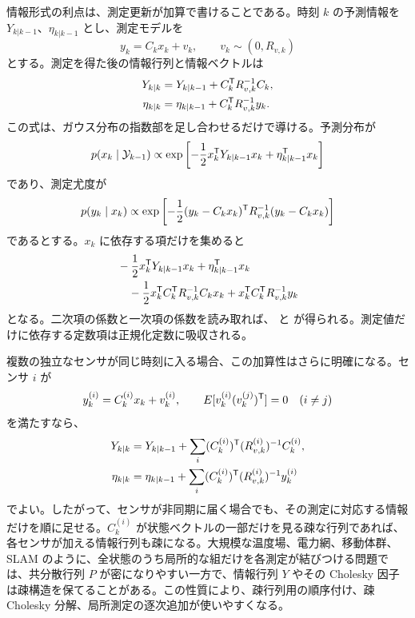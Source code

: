 情報形式の利点は、測定更新が加算で書けることである。時刻 $k$ の予測情報を $Y_{k|k-1}$、$\eta_{k|k-1}$ とし、測定モデルを
\begin{equation}
  y_k=C_kx_k+v_k,
  \qquad
  v_k\sim(0,R_{v,k})
\end{equation}
とする。測定を得た後の情報行列と情報ベクトルは
\begin{align}
  Y_{k|k}
  &=
  Y_{k|k-1}+C_k^{\mathsf{T}} R_{v,k}^{-1}C_k,
  \label{eq:information-update-matrix}\\
  \eta_{k|k}
  &=
  \eta_{k|k-1}+C_k^{\mathsf{T}} R_{v,k}^{-1}y_k.
  \label{eq:information-update-vector}
\end{align}
この式は、ガウス分布の指数部を足し合わせるだけで導ける。予測分布が
\begin{equation}
  p(x_k\mid\mathcal{Y}_{k-1})
  \propto
  \exp\left[
    -\frac{1}{2}x_k^{\mathsf{T}} Y_{k|k-1}x_k
    +\eta_{k|k-1}^{\mathsf{T}} x_k
  \right]
\end{equation}
であり、測定尤度が
\begin{equation}
  p(y_k\mid x_k)
  \propto
  \exp\left[
    -\frac{1}{2}(y_k-C_kx_k)^{\mathsf{T}} R_{v,k}^{-1}(y_k-C_kx_k)
  \right]
\end{equation}
であるとする。$x_k$ に依存する項だけを集めると
\begin{align}
  &-\frac{1}{2}x_k^{\mathsf{T}} Y_{k|k-1}x_k+\eta_{k|k-1}^{\mathsf{T}} x_k\\
  &\quad
  -\frac{1}{2}x_k^{\mathsf{T}} C_k^{\mathsf{T}} R_{v,k}^{-1}C_kx_k
  +x_k^{\mathsf{T}} C_k^{\mathsf{T}} R_{v,k}^{-1}y_k
\end{align}
となる。二次項の係数と一次項の係数を読み取れば、 と  が得られる。測定値だけに依存する定数項は正規化定数に吸収される。

複数の独立なセンサが同じ時刻に入る場合、この加算性はさらに明確になる。センサ $i$ が
\begin{equation}
  y_k^{(i)}=C_k^{(i)}x_k+v_k^{(i)},
  \qquad
  E[v_k^{(i)}(v_k^{(j)})^{\mathsf{T}}]=0\quad(i\ne j)
\end{equation}
を満たすなら、
\begin{align}
  Y_{k|k}
  &=
  Y_{k|k-1}
  +\sum_i (C_k^{(i)})^{\mathsf{T}}
    (R_{v,k}^{(i)})^{-1}C_k^{(i)},\\
  \eta_{k|k}
  &=
  \eta_{k|k-1}
  +\sum_i (C_k^{(i)})^{\mathsf{T}}
    (R_{v,k}^{(i)})^{-1}y_k^{(i)}
\end{align}
でよい。したがって、センサが非同期に届く場合でも、その測定に対応する情報だけを順に足せる。$C_k^{(i)}$ が状態ベクトルの一部だけを見る疎な行列であれば、各センサが加える情報行列も疎になる。大規模な温度場、電力網、移動体群、SLAM のように、全状態のうち局所的な組だけを各測定が結びつける問題では、共分散行列 $P$ が密になりやすい一方で、情報行列 $Y$ やその Cholesky 因子は疎構造を保てることがある。この性質により、疎行列用の順序付け、疎 Cholesky 分解、局所測定の逐次追加が使いやすくなる。

